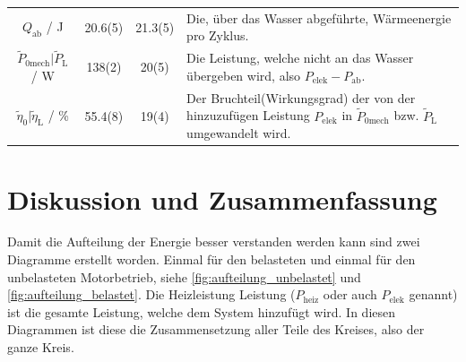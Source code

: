 \documentclass[11pt]{scrartcl}
\begin{document}
\begin{table}[H]
\begin{tabular}{c|S[table-format=3.3(3)]|S[table-format=2.3(3)]|p{5cm}}
        $Q_{\text{ab}}$  / J                           & 20.6(5)           & 21.3(5)             & Die, über das Wasser abgeführte, Wärmeenergie pro Zyklus. \\
        $\tilde{P}_{\text{0mech}} | \tilde{P}_{\text{L}}$ / W & 138(2)            & 20(5)               & Die Leistung, welche nicht an das Wasser übergeben wird, also $P_{\text{elek}}-P_{\text{ab}}$. \\
        $\tilde{\eta}_{0} | \tilde{\eta}_{\text{L}}$ / \%     & 55.4(8)           & 19(4)               & Der Bruchteil(Wirkungsgrad) der von der hinzuzufügen Leistung $P_{\text{elek}}$ in $\tilde{P}_{\text{0mech}}$ bzw. $\tilde{P}_{\text{L}}$ umgewandelt wird.\\
    \end{tabular}
\end{table}

\section{Diskussion und Zusammenfassung}
\label{sec:diskussion_zusammenfassung}
Damit die Aufteilung der Energie besser verstanden werden kann sind zwei Diagramme
erstellt worden. Einmal für den belasteten und einmal für den unbelasteten 
Motorbetrieb, siehe \autoref{fig:aufteilung_unbelastet} und \autoref{fig:aufteilung_belastet}.
Die Heizleistung Leistung ($P_{\text{heiz}}$ oder auch $P_{\text{elek}}$ genannt) ist die gesamte 
Leistung, welche dem System hinzufügt wird. In diesen Diagrammen ist diese
die Zusammensetzung aller Teile des Kreises, also der ganze Kreis.
\end{document}
